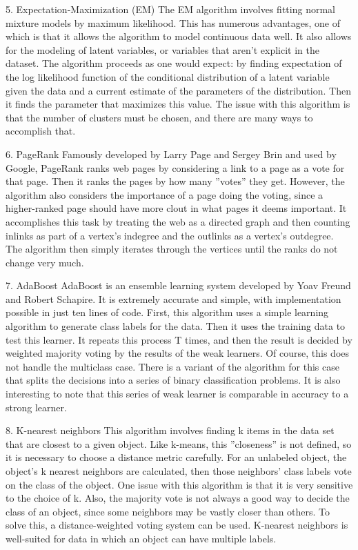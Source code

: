 5. Expectation-Maximization (EM)  The EM algorithm involves 
fitting normal mixture models
by maximum likelihood. This has numerous advantages, one
of which is that it allows the algorithm to model continuous
data well. It also allows for the modeling of latent variables,
or variables that aren’t explicit in the dataset. The algorithm
proceeds as one would expect: by finding expectation of the
log likelihood function of the conditional distribution of a
latent variable given the data and a current estimate of the
parameters of the distribution. Then it finds the parameter that
maximizes this value. The issue with this algorithm is that the
number of clusters must be chosen, and there are many ways
to accomplish that.

6. PageRank  Famously developed by Larry Page and Sergey Brin and used
by Google, PageRank ranks web pages by considering a link
to a page as a vote for that page. Then it ranks the pages
by how many ”votes” they get. However, the algorithm also
considers the importance of a page doing the voting, since
a higher-ranked page should have more clout in what pages
it deems important. It accomplishes this task by treating the
web as a directed graph and then counting inlinks as part of
a vertex’s indegree and the outlinks as a vertex’s outdegree.
The algorithm then simply iterates through the vertices until
the ranks do not change very much.

7. AdaBoost  AdaBoost is an ensemble learning system developed by Yoav
Freund and Robert Schapire. It is extremely accurate and
simple, with implementation possible in just ten lines of code.
First, this algorithm uses a simple learning algorithm to generate
class labels for the data. Then it uses the training data to
test this learner. It repeats this process T times, and then the
result is decided by weighted majority voting by the results of
the weak learners. Of course, this does not handle the multiclass
case. There is a variant of the algorithm for this case
that splits the decisions into a series of binary classification
problems. It is also interesting to note that this series of weak
learner is comparable in accuracy to a strong learner.

8. K-nearest neighbors  This algorithm involves finding k items 
in the data set that
are closest to a given object. Like k-means, this ”closeness”
is not defined, so it is necessary to choose a distance metric
carefully. For an unlabeled object, the object’s k nearest
neighbors are calculated, then those neighbors’ class labels
vote on the class of the object. One issue with this algorithm
is that it is very sensitive to the choice of k. Also, the majority
vote is not always a good way to decide the class of an object,
since some neighbors may be vastly closer than others. To
solve this, a distance-weighted voting system can be used.
K-nearest neighbors is well-suited for data in which an object
can have multiple labels.

